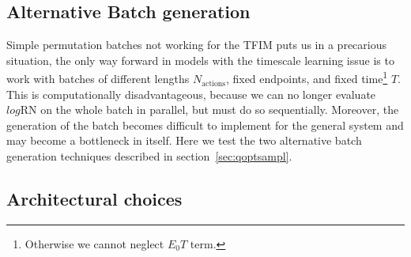 \subsection{Alternative Batch generation}
Simple permutation batches not working for the TFIM puts us in a precarious situation, the only way forward in models with the timescale learning issue is to work with batches of different lengths $N_{\text{actions}}$, fixed endpoints, and fixed time\footnote{Otherwise we cannot neglect $E_0T$ term.} $T$. This is computationally disadvantageous, because we can no longer evaluate $log \text{RN}$ on the whole batch in parallel, but must do so sequentially. Moreover, the generation of the batch becomes difficult to implement for the general system and may become a bottleneck in itself. Here we test the two alternative batch generation techniques described in section~\ref{sec:qoptsampl}. 


\newpage
\subsection{Architectural choices}
